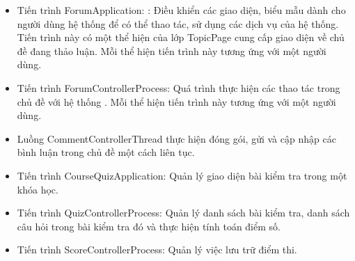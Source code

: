 \documentclass[./../main.tex]{subfiles}
\begin{document}
\begin{itemize}
		\item Tiến trình ForumApplication: : Điều khiển các giao diện, biểu mẫu dành cho người dùng hệ thống để có thể thao tác, sử dụng các dịch vụ của hệ thống. Tiến trình này có một thể hiện của lớp TopicPage cung cấp giao diện về chủ đề đang thảo luận.
		Mỗi thể hiện tiến trình này tương ứng với một người dùng.
		\item Tiến trình ForumControllerProcess: Quá trình thực hiện các thao tác trong chủ đề với hệ thống .
		Mỗi thể hiện tiến trình này tương ứng với một người dùng.
		\item Luồng CommentControllerThread thực hiện đóng gói, gửi và cập nhập các bình luận trong chủ đề một cách liên tục.
		
		\item Tiến trình CourseQuizApplication: Quản lý giao diện bài kiểm tra trong một khóa học.
		\item Tiến trình QuizControllerProcess: Quản lý danh sách bài kiểm tra, danh sách câu hỏi trong bài kiểm tra đó và thực hiện tính toán điểm số.
		\item Tiến trình ScoreControllerProcess: Quản lý việc lưu trữ điểm thi.
		

\end{itemize}
\end{document}
